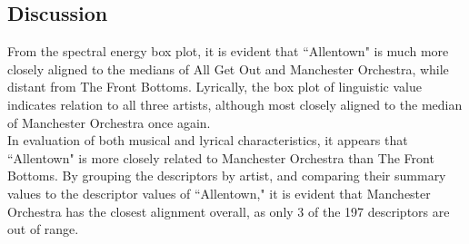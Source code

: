 \documentclass{article}\usepackage[]{graphicx}\usepackage[]{xcolor}
\begin{document}
\begin{multicols}{2}
\section{Discussion}

From the spectral energy box plot, it is evident that ``Allentown" is much more closely aligned to the medians of All Get Out and Manchester Orchestra, while distant from The Front Bottoms. Lyrically, the box plot of linguistic value indicates relation to all three artists, although most closely aligned to the median of Manchester Orchestra once again. \\

\noindent In evaluation of both musical and lyrical characteristics, it appears that ``Allentown" is more closely related to Manchester Orchestra than The Front Bottoms. By grouping the descriptors by artist, and comparing their summary values to the descriptor values of ``Allentown," it is evident that Manchester Orchestra has the closest alignment overall, as only 3 of the 197 descriptors are out of range.

\vspace{2em}

\begin{tiny}

\end{tiny}
\end{multicols}

\newpage
\onecolumn
\end{document}
